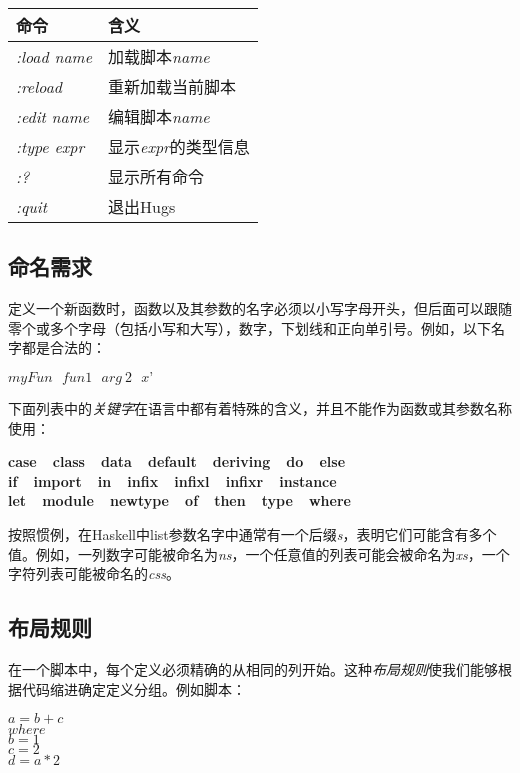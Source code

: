 \begin{table}[htbp]
\label{tab:threesome}
\centering
\begin{tabular}{ll}
\hline
命令 & 含义\\
\hline
\textit{:load name} & 加载脚本\textit{name} \\
\textit{:reload} & 重新加载当前脚本 \\
\textit{:edit name} & 编辑脚本\textit{name} \\
\textit{:type expr} & 显示\textit{expr}的类型信息 \\
\textit{:?} & 显示所有命令 \\
\textit{:quit} & 退出Hugs \\
\hline
\end{tabular}
\end{table}

\subsection{命名需求}
定义一个新函数时，函数以及其参数的名字必须以小写字母开头，但后面可以跟随零个或多个字母（包括小写和大写），数字，下划线和正向单引号。例如，以下名字都是合法的：

\centerline{$myFun~~~fun1~~~arg~2~~~x’$}

下面列表中的\textit{关键字}在语言中都有着特殊的含义，并且不能作为函数或其参数名称使用：

\begin{center}
\textbf{case~~class~~data~~default~~deriving~~do~~else}\\
\textbf{if~~import~~in~~infix~~infixl~~infixr~~instance}\\
\textbf{let~~module~~newtype~~of~~then~~type~~where}
\end{center}

按照惯例，在Haskell中list参数名字中通常有一个后缀\textit{s}，表明它们可能含有多个值。例如，一列数字可能被命名为\textit{ns}，一个任意值的列表可能会被命名为\textit{xs}，一个字符列表可能被命名的\textit{css}。

\subsection{布局规则}

在一个脚本中，每个定义必须精确的从相同的列开始。这种\textit{布局规则}使我们能够根据代码缩进确定定义分组。例如脚本：

\noindent\hspace*{1cm} $a = b + c$\\
\hspace*{2cm} $        where $\\
\hspace*{3cm} $            b = 1$\\
\hspace*{3cm} $            c = 2$\\
\hspace*{1cm} $d = a * 2$

